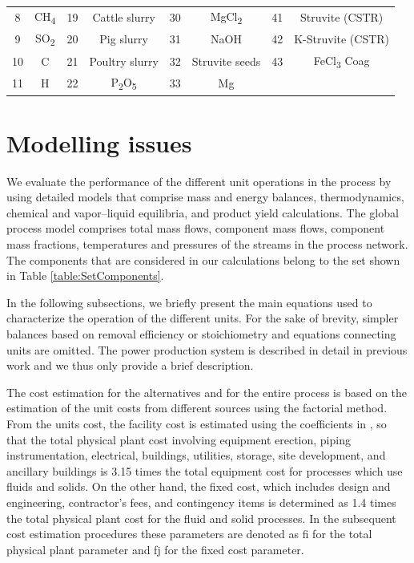 \begin{refsection}[referencesCh2]
\begin{table}[]
{\begin{tabular}{@{}cccccccc@{}}
			8                    & CH\textsubscript{4}       & 19                   & Cattle slurry  & 30                   & MgCl\textsubscript{2}          & 41                   & Struvite (CSTR)  \\
			9                    & SO\textsubscript{2}       & 20                   & Pig slurry     & 31                   & NaOH           & 42                   & K-Struvite (CSTR) \\
			10                   & C         & 21                   & Poultry slurry & 32                   & Struvite seeds & 43                   & FeCl\textsubscript{3} Coag     \\
			11                   & H         & 22                   & P\textsubscript{2}O\textsubscript{5}          & 33                   & Mg             &                      &     \\          
		\bottomrule
		\end{tabular}
	}
\end{table}


\section{Modelling issues} \label{section:ModellingIssues}
We evaluate the performance of the different unit operations in the process by using detailed models that comprise mass and energy balances, thermodynamics, chemical and vapor–liquid equilibria, and product yield calculations. The global process model comprises total mass flows, component mass flows, component mass fractions, temperatures and pressures of the streams in the process network. The components that are considered in our calculations belong to the set shown in Table \ref{table:SetComponents}.

In the following subsections, we briefly present the main equations used to characterize the operation of the different units. For the sake of brevity, simpler balances based on removal efficiency or stoichiometry and equations connecting units are omitted. The power production system is described in detail in previous work \citep{Leon} and we thus only provide a brief description.

The cost estimation for the alternatives and for the entire process is based on the estimation of the unit costs from different sources using the factorial method. From the units cost, the facility cost is estimated using the coefficients in \citet{sinnott1999chemical}, so that the total physical plant cost involving equipment erection, piping instrumentation, electrical, buildings, utilities, storage, site development, and ancillary buildings is 3.15 times the total equipment cost for processes which use fluids and solids. On the other hand, the fixed cost, which includes design and engineering, contractor’s fees, and contingency items is determined as 1.4 times the total physical plant cost for the fluid and solid processes. In the subsequent cost estimation procedures these parameters are denoted as fi for the total physical plant parameter and fj for the fixed cost parameter.



\end{refsection}
